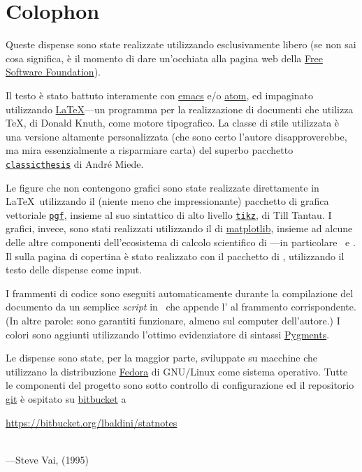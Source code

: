 \chapter*{Colophon}

Queste dispense sono state realizzate utilizzando esclusivamente 
libero (se non sai cosa significa, è il momento di dare un'occhiata alla
pagina web della \href{http://www.fsf.org/}{Free Software Foundation}).

Il testo è stato battuto interamente con
\href{https://www.gnu.org/software/emacs/}{emacs} e/o \href{https://atom.io/}{atom},
ed impaginato utilizzando \href{https://www.latex-project.org/}{\LaTeX}---un programma
per la realizzazione di documenti che utilizza \TeX, di Donald Knuth, come motore
tipografico. La classe di stile utilizzata è una versione altamente
personalizzata (che sono certo l'autore disapproverebbe, ma mira essenzialmente
a risparmiare carta) del superbo pacchetto
\href{http://www.ctan.org/tex-archive/macros/latex/contrib/classicthesis/}{\texttt{classicthesis}} di André Miede.

Le figure che non contengono grafici sono state realizzate direttamente in
\LaTeX\ utilizzando il (niente meno che impressionante) pacchetto di grafica
vettoriale \href{https://www.ctan.org/pkg/pgf}{\texttt{pgf}}, insieme al suo
 sintattico di alto livello
\href{http://www.texample.net/tikz/}{\texttt{tikz}}, di Till Tantau.
I grafici, invece, sono stati realizzati utilizzando il 
 di \href{http://matplotlib.org/}{matplotlib}, insieme ad alcune
delle altre componenti dell'ecosistema di calcolo scientifico di
\python---in particolare \numpy\ e \scipy.
Il  sulla pagina di copertina è stato realizzato con il pacchetto
\href{https://github.com/amueller/word_cloud}{} di \python,
utilizzando il testo delle dispense come input.

I frammenti di codice sono eseguiti automaticamente durante la compilazione
del documento da un semplice \emph{script} in \python\ che appende l'
al frammento corrispondente. (In altre parole: sono garantiti funzionare,
almeno sul computer dell'autore.) I colori sono aggiunti utilizzando
l'ottimo evidenziatore di sintassi \href{http://pygments.org/}{Pygments}.

Le dispense sono state, per la maggior parte, sviluppate su macchine che
utilizzano la distribuzione \href{https://getfedora.org/}{Fedora} di GNU/Linux
come sistema operativo. Tutte le componenti del progetto sono sotto controllo
di configurazione ed il repositorio \href{https://git-scm.com/}{git} è
ospitato su \href{https://bitbucket.org}{bitbucket} a
\begin{center}
  \url{https://bitbucket.org/lbaldini/statnotes}
\end{center}


\vfill

\noindent{}\\
---Steve Vai,  (1995)
